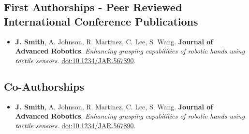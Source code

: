 \subsection*{First Authorships - Peer Reviewed International Conference Publications} \label{sec:publications:peer_reviewed_conf_first}

\begin{itemize}
    \item[] \textbf{J. Smith}, A. Johnson, R. Martinez, C. Lee, S. Wang. \textbf{Journal of Advanced Robotics}. \textit{Enhancing grasping capabilities of robotic hands using tactile sensors}. \url{doi:10.1234/JAR.567890}.
\end{itemize}

\subsection*{Co-Authorships} \label{sec:publications:other_co}

\begin{itemize}
    \item[] \textbf{J. Smith}, A. Johnson, R. Martinez, C. Lee, S. Wang. \textbf{Journal of Advanced Robotics}. \textit{Enhancing grasping capabilities of robotic hands using tactile sensors}. \url{doi:10.1234/JAR.567890}.
\end{itemize}
